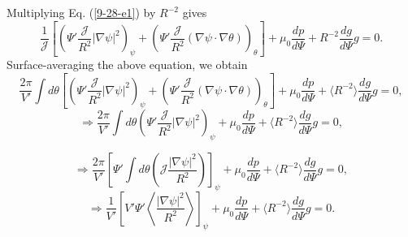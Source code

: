 \documentclass{article}
\begin{document}
Multiplying Eq. (\ref{9-28-e1}) by $R^{- 2}$ gives
\begin{equation}
  \frac{1}{\mathcal{J}} \left[ \left( \Psi' \frac{\mathcal{J}}{R^2} | \nabla
  \psi |^2 \right)_{\psi} + \left( \Psi' \frac{\mathcal{J}}{R^2} (\nabla \psi
  \cdot \nabla \theta) \right)_{\theta} \right] + \mu_0 \frac{d p}{d \Psi} +
  R^{- 2} \frac{d g}{d \Psi} g = 0.
\end{equation}
Surface-averaging the above equation, we obtain
\begin{equation}
  \frac{2 \pi}{V'} \int d \theta \left[ \left( \Psi' \frac{\mathcal{J}}{R^2} |
  \nabla \psi |^2 \right)_{\psi} + \left( \Psi' \frac{\mathcal{J}}{R^2}
  (\nabla \psi \cdot \nabla \theta) \right)_{\theta} \right] + \mu_0 \frac{d
  p}{d \Psi} + \langle R^{- 2} \rangle \frac{d g}{d \Psi} g = 0,
\end{equation}
\begin{equation}
  \Rightarrow \frac{2 \pi}{V'} \int d \theta \left( \Psi'
  \frac{\mathcal{J}}{R^2} | \nabla \psi |^2 \right)_{\psi} + \mu_0 \frac{d
  p}{d \Psi} + \langle R^{- 2} \rangle \frac{d g}{d \Psi} g = 0,
\end{equation}

\begin{equation}
  \Rightarrow \frac{2 \pi}{V'} \left[ \Psi' \int d \theta \left( \mathcal{J}
  \frac{| \nabla \psi |^2}{R^2} \right) \right]_{\psi} + \mu_0 \frac{d p}{d
  \Psi} + \langle R^{- 2} \rangle \frac{d g}{d \Psi} g = 0,
\end{equation}
\begin{equation}
  \Rightarrow \frac{1}{V'} \left[ V' \Psi' \left\langle \frac{| \nabla \psi
  |^2}{R^2} \right\rangle \right]_{\psi} + \mu_0 \frac{d p}{d \Psi} + \langle
  R^{- 2} \rangle \frac{d g}{d \Psi} g = 0.
\end{equation}
\end{document}
